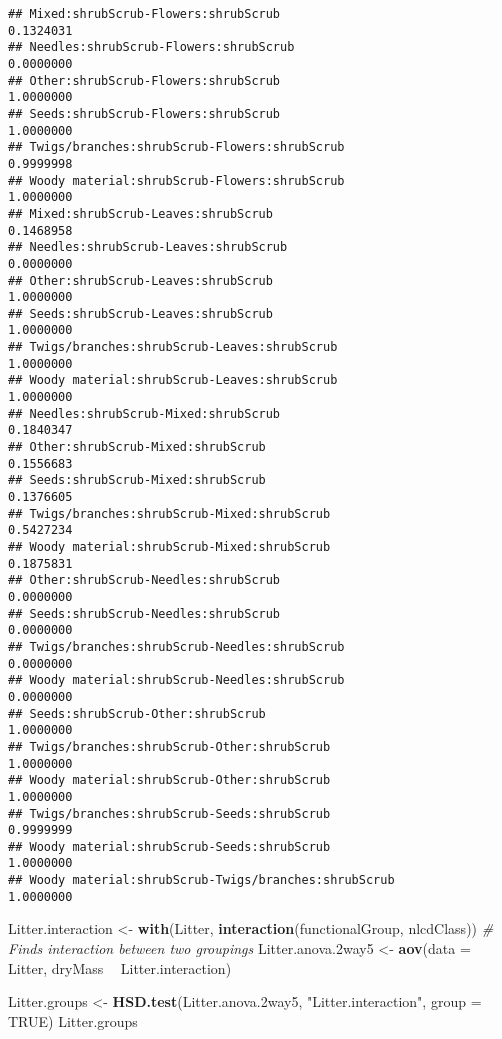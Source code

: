 \documentclass[
]{article}
\newenvironment{Shaded}{\begin{snugshade}}{\end{snugshade}}
\newcommand{\CommentTok}[1]{\textcolor[rgb]{0.56,0.35,0.01}{\textit{#1}}}
\newcommand{\DataTypeTok}[1]{\textcolor[rgb]{0.13,0.29,0.53}{#1}}
\newcommand{\FloatTok}[1]{\textcolor[rgb]{0.00,0.00,0.81}{#1}}
\newcommand{\KeywordTok}[1]{\textcolor[rgb]{0.13,0.29,0.53}{\textbf{#1}}}
\newcommand{\NormalTok}[1]{#1}
\newcommand{\OperatorTok}[1]{\textcolor[rgb]{0.81,0.36,0.00}{\textbf{#1}}}
\newcommand{\OtherTok}[1]{\textcolor[rgb]{0.56,0.35,0.01}{#1}}
\newcommand{\StringTok}[1]{\textcolor[rgb]{0.31,0.60,0.02}{#1}}
\begin{document}
\begin{verbatim}
## Mixed:shrubScrub-Flowers:shrubScrub                                   0.1324031
## Needles:shrubScrub-Flowers:shrubScrub                                 0.0000000
## Other:shrubScrub-Flowers:shrubScrub                                   1.0000000
## Seeds:shrubScrub-Flowers:shrubScrub                                   1.0000000
## Twigs/branches:shrubScrub-Flowers:shrubScrub                          0.9999998
## Woody material:shrubScrub-Flowers:shrubScrub                          1.0000000
## Mixed:shrubScrub-Leaves:shrubScrub                                    0.1468958
## Needles:shrubScrub-Leaves:shrubScrub                                  0.0000000
## Other:shrubScrub-Leaves:shrubScrub                                    1.0000000
## Seeds:shrubScrub-Leaves:shrubScrub                                    1.0000000
## Twigs/branches:shrubScrub-Leaves:shrubScrub                           1.0000000
## Woody material:shrubScrub-Leaves:shrubScrub                           1.0000000
## Needles:shrubScrub-Mixed:shrubScrub                                   0.1840347
## Other:shrubScrub-Mixed:shrubScrub                                     0.1556683
## Seeds:shrubScrub-Mixed:shrubScrub                                     0.1376605
## Twigs/branches:shrubScrub-Mixed:shrubScrub                            0.5427234
## Woody material:shrubScrub-Mixed:shrubScrub                            0.1875831
## Other:shrubScrub-Needles:shrubScrub                                   0.0000000
## Seeds:shrubScrub-Needles:shrubScrub                                   0.0000000
## Twigs/branches:shrubScrub-Needles:shrubScrub                          0.0000000
## Woody material:shrubScrub-Needles:shrubScrub                          0.0000000
## Seeds:shrubScrub-Other:shrubScrub                                     1.0000000
## Twigs/branches:shrubScrub-Other:shrubScrub                            1.0000000
## Woody material:shrubScrub-Other:shrubScrub                            1.0000000
## Twigs/branches:shrubScrub-Seeds:shrubScrub                            0.9999999
## Woody material:shrubScrub-Seeds:shrubScrub                            1.0000000
## Woody material:shrubScrub-Twigs/branches:shrubScrub                   1.0000000
\end{verbatim}

\begin{Shaded}
\begin{Highlighting}[]
\NormalTok{Litter.interaction <-}\StringTok{ }\KeywordTok{with}\NormalTok{(Litter, }\KeywordTok{interaction}\NormalTok{(functionalGroup, nlcdClass)) }\CommentTok{# Finds interaction between two groupings}
\NormalTok{Litter.anova}\FloatTok{.2}\NormalTok{way5 <-}\StringTok{ }\KeywordTok{aov}\NormalTok{(}\DataTypeTok{data =}\NormalTok{ Litter, dryMass }\OperatorTok{~}\StringTok{ }\NormalTok{Litter.interaction)}

\NormalTok{Litter.groups <-}\StringTok{ }\KeywordTok{HSD.test}\NormalTok{(Litter.anova}\FloatTok{.2}\NormalTok{way5, }\StringTok{"Litter.interaction"}\NormalTok{, }\DataTypeTok{group =} \OtherTok{TRUE}\NormalTok{)}
\NormalTok{Litter.groups}
\end{Highlighting}
\end{Shaded}
\end{document}
